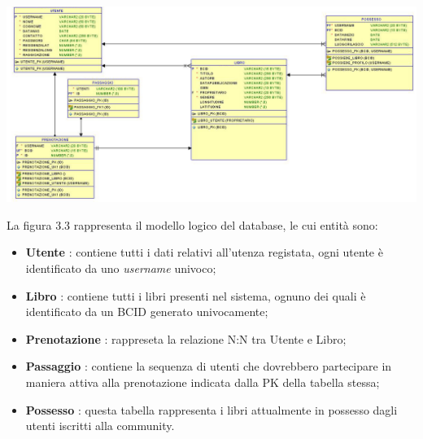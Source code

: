 \begin{center}
\begin{sideways}%
	\begin{minipage}{1.3\textwidth}
		\includegraphics[width=\linewidth,keepaspectratio]{Immagini/db_schema.jpg}
		\vspace{0.2cm}
		\label{fig:xx}
	\end{minipage}
\end{sideways}
\end{center}

La figura 3.3 rappresenta il modello logico del database, le cui entità sono:
\begin{itemize}
	\item \textbf{Utente} : contiene tutti i dati relativi all'utenza registata, ogni utente è identificato da uno \textit{username} univoco;
	\item \textbf{Libro} : contiene tutti i libri presenti nel sistema, ognuno dei quali è identificato da un BCID generato univocamente;
	\item \textbf{Prenotazione} : rappreseta la relazione N:N tra Utente e Libro;
	\item \textbf{Passaggio} : contiene la sequenza di utenti che dovrebbero partecipare in maniera attiva alla prenotazione indicata dalla PK della tabella stessa;
	\item \textbf{Possesso} : questa tabella rappresenta i libri attualmente in possesso dagli utenti iscritti alla community.
\end{itemize}